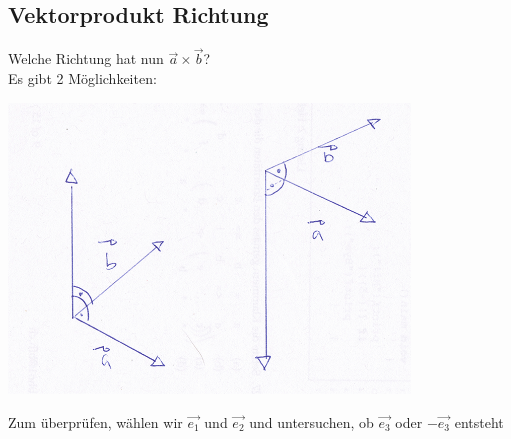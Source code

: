  \subsection{Vektorprodukt Richtung}
 Welche Richtung hat nun $\vec{a} \times \vec{b}$?\\
 Es gibt 2 Möglichkeiten:\\
\begin{center}
	 \includegraphics[width=0.8\textwidth]{imgs/richtung_kreuzprodukt.png}
 \end{center}
 \noindent
 Zum überprüfen, wählen wir $\vec{e_1}$ und $\vec{e_2}$ und untersuchen, ob $\vec{e_3}$ oder $-\vec{e_3}$ entsteht
 
